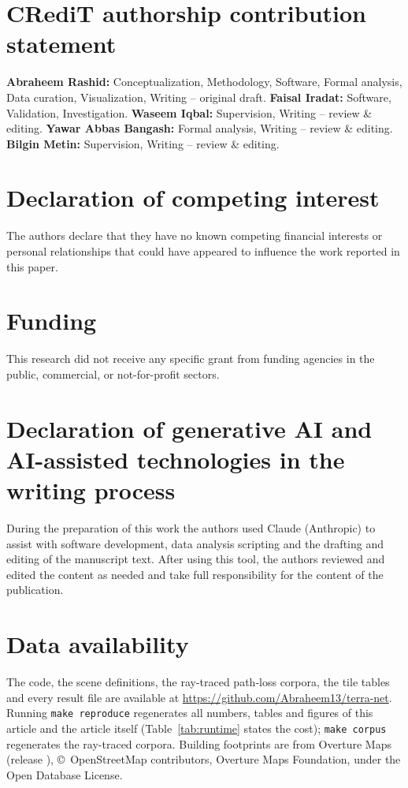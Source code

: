 \section*{CRediT authorship contribution statement}
\textbf{Abraheem Rashid:} Conceptualization, Methodology, Software, Formal
analysis, Data curation, Visualization, Writing -- original draft.
\textbf{Faisal Iradat:} Software, Validation, Investigation.
\textbf{Waseem Iqbal:} Supervision, Writing -- review \& editing.
\textbf{Yawar Abbas Bangash:} Formal analysis, Writing -- review \& editing.
\textbf{Bilgin Metin:} Supervision, Writing -- review \& editing.

\section*{Declaration of competing interest}
The authors declare that they have no known competing financial interests
or personal relationships that could have appeared to influence the work
reported in this paper.

\section*{Funding}
This research did not receive any specific grant from funding agencies in
the public, commercial, or not-for-profit sectors.

\section*{Declaration of generative AI and AI-assisted technologies in the
writing process}
During the preparation of this work the authors used Claude (Anthropic) to
assist with software development, data analysis scripting and the drafting
and editing of the manuscript text. After using this tool, the authors
reviewed and edited the content as needed and take full responsibility for
the content of the publication.

\section*{Data availability}
The code, the scene definitions, the ray-traced path-loss corpora, the tile
tables and every result file are available at
\url{https://github.com/Abraheem13/terra-net}. Running \texttt{make
reproduce} regenerates all numbers, tables and figures of this article and
the article itself (Table~\ref{tab:runtime} states the cost); \texttt{make
corpus} regenerates the ray-traced corpora. Building footprints are from
Overture Maps (release \overtureRelease{}), \copyright~OpenStreetMap
contributors, Overture Maps Foundation, under the Open Database License.
